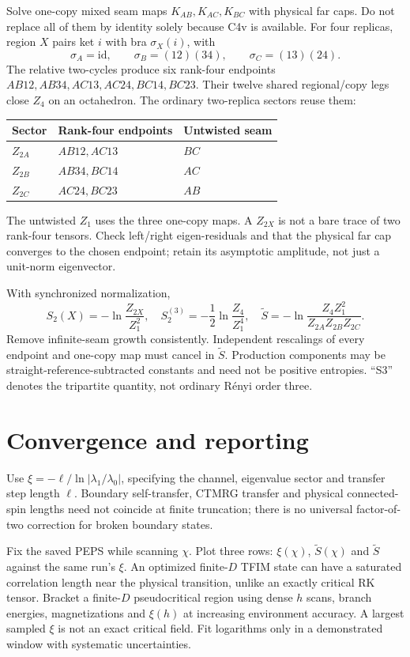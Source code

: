 \documentclass[11pt]{article}
\newcommand{\tS}{\widetilde S}
\begin{document}
Solve one-copy mixed seam maps $K_{AB},K_{AC},K_{BC}$ with physical far caps.
Do not replace all of them by identity solely because C4v is available.
For four replicas, region $X$ pairs ket $i$ with bra $\sigma_X(i)$, with
\[
 \sigma_A=\mathrm{id},\qquad\sigma_B=(12)(34),\qquad\sigma_C=(13)(24).
\]
The relative two-cycles produce six rank-four endpoints
$AB12,AB34,AC13,AC24,BC14,BC23$. Their twelve shared regional/copy legs
close $Z_4$ on an octahedron. The ordinary two-replica sectors reuse them:
\begin{center}\begin{tabular}{lll}\toprule
Sector & Rank-four endpoints & Untwisted seam\\\midrule
$Z_{2A}$ & $AB12,AC13$ & $BC$\\
$Z_{2B}$ & $AB34,BC14$ & $AC$\\
$Z_{2C}$ & $AC24,BC23$ & $AB$\\\bottomrule
\end{tabular}\end{center}
The untwisted $Z_1$ uses the three one-copy maps. A $Z_{2X}$ is not a bare
trace of two rank-four tensors. Check left/right eigen-residuals and that the
physical far cap converges to the chosen endpoint; retain its asymptotic
amplitude, not just a unit-norm eigenvector.

With synchronized normalization,
\[
 S_2(X)=-\ln\frac{Z_{2X}}{Z_1^2},\quad
 S_2^{(3)}=-\frac12\ln\frac{Z_4}{Z_1^4},\quad
 \boxed{\tS=-\ln\frac{Z_4Z_1^2}{Z_{2A}Z_{2B}Z_{2C}}}.
\]
Remove infinite-seam growth consistently. Independent rescalings of every
endpoint and one-copy map must cancel in $\tS$. Production components may
be straight-reference-subtracted constants and need not be positive entropies.
``S3'' denotes the tripartite quantity, not ordinary R\'enyi order three.

\section{Convergence and reporting}
Use $\xi=-\ell/\ln|\lambda_1/\lambda_0|$, specifying the channel, eigenvalue
sector and transfer step length $\ell$. Boundary self-transfer, CTMRG transfer
and physical connected-spin lengths need not coincide at finite truncation;
there is no universal factor-of-two correction for broken boundary states.

Fix the saved PEPS while scanning $\chi$. Plot three rows: $\xi(\chi)$,
$\tS(\chi)$ and $\tS$ against the same run's $\xi$. An optimized finite-$D$
TFIM state can have a saturated correlation length near the physical transition,
unlike an exactly critical RK tensor. Bracket a finite-$D$ pseudocritical
region using dense $h$ scans, branch energies, magnetizations and $\xi(h)$
at increasing environment accuracy. A largest sampled $\xi$ is not an exact
critical field. Fit logarithms only in a demonstrated window with systematic
uncertainties.
\end{document}
